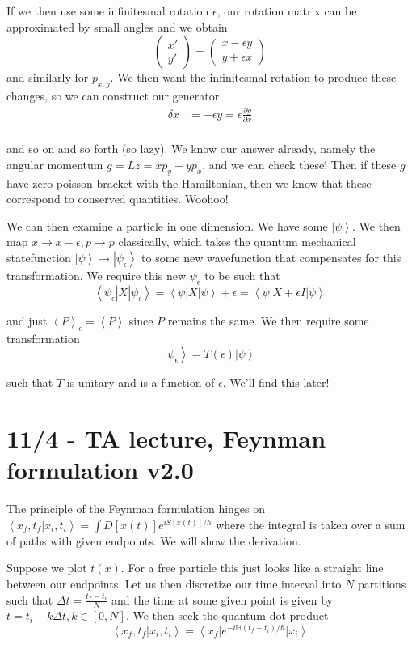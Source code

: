 \documentclass[10pt]{report}
\newcommand{\bra}[1]{\left<#1\right|}
\newcommand{\ket}[1]{\left|#1\right>}
\newcommand{\dotp}[2]{\left<#1\left.\right|#2\right>}
\newcommand{\pd}[2]{\frac{\partial #1}{\partial#2}}
\newcommand{\expvalue}[1]{\left<#1\right>}
\begin{document}
If we then use some infinitesmal rotation $\epsilon$, our rotation matrix can be approximated by small angles and we obtain
$$\begin{pmatrix}x'\\y'\end{pmatrix} = \begin{pmatrix}x-\epsilon y \\ y + \epsilon x\end{pmatrix}$$
and similarly for $p_{x,y}$. We then want the infinitesmal rotation to produce these changes, so we can construct our generator
\begin{align}
	\delta x &= -\epsilon y = \epsilon \pd{g}{x}\\
\end{align}

and so on and so forth (so lazy). We know our answer already, namely the angular momentum $g = Lz = xp_y - yp_x$, and we can check these! Then if these $g$ have zero poisson bracket with the Hamiltonian, then we know that these correspond to conserved quantities. Woohoo!

We can then examine a particle in one dimension. We have some $\ket{\psi}$. We then map $x \to x + \epsilon, p \to p$ classically, which takes the quantum mechanical statefunction $\ket{\psi} \to \ket{\psi_\epsilon}$ to some new wavefunction that compensates for this transformation. We require this new $\psi_\epsilon$ to be such that
$$\bra{\psi_\epsilon}X\ket{\psi_\epsilon} = \bra{\psi}X\ket{\psi} + \epsilon = \bra{\psi}X+\epsilon I \ket{\psi}$$

and just $\expvalue{P}_\epsilon = \expvalue{P}$ since $P$ remains the same. We then require some transformation
$$\ket{\psi_\epsilon} = T(\epsilon)\ket{\psi}$$

such that $T$ is unitary and is a function of $\epsilon$. We'll find this later!

\chapter{11/4 - TA lecture, Feynman formulation v2.0}

The principle of the Feynman formulation hinges on $\dotp{x_f, t_f}{x_i, t_i} = \int D[x(t)] e^{iS[x(t)]/\hbar}$ where the integral is taken over a sum of paths with given endpoints. We will show the derivation.

Suppose we plot $t(x)$. For a free particle this just looks like a straight line between our endpoints. Let us then discretize our time interval into $N$ partitions such that $\Delta t = \frac{t_f - t_i}{N}$ and the time at some given point is given by $t = t_i + k\Delta t, k \in [0,N]$. We then seek the quantum dot product 
$$\dotp{x_f, t_f}{x_i, t_i} = \bra{x_f} e^{-i\mathbb{H}(t_f - t_i)/\hbar}\ket{x_i}$$
\end{document}
